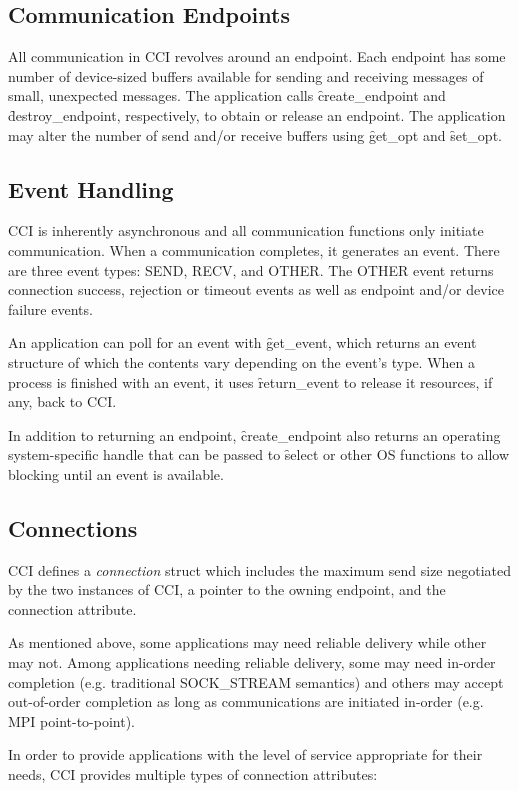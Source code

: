 \documentclass[conference]{IEEEtran}
\begin{document}
\subsection{Communication Endpoints}
All communication in CCI revolves around an endpoint. Each endpoint has some number of
device-sized buffers available for sending and receiving messages of small, unexpected
messages. The application calls \f{create\_endpoint} and \f{destroy\_endpoint},
respectively, to obtain or release an endpoint. The application may alter the number of
send and/or receive buffers using \f{get\_opt} and \f{set\_opt}.

\subsection{Event Handling}
CCI is inherently asynchronous and all communication functions only initiate
communication. When a communication completes, it generates an event. There are three
event types: SEND, RECV, and OTHER. The OTHER event returns connection success, rejection
or timeout events as well as endpoint and/or device failure events.

An application can poll for an event with \f{get\_event}, which returns an event structure
of which the contents vary depending on the event's type. When a process is finished with
an event, it uses \f{return\_event} to release it resources, if any, back to CCI.

In addition to returning an endpoint, \f{create\_endpoint} also returns an operating
system-specific handle that can be passed to \f{select} or other OS functions to allow
blocking until an event is available.

\subsection{Connections}
CCI defines a \emph{connection} struct which includes the maximum send size negotiated by
the two instances of CCI, a pointer to the owning endpoint, and the connection attribute.

As mentioned above, some applications may need reliable delivery while other may not.
Among applications needing reliable delivery, some may need in-order completion (e.g.
traditional SOCK\_STREAM semantics) and others may accept out-of-order completion as long
as communications are initiated in-order (e.g. MPI point-to-point).

In order to provide applications with the level of service appropriate for their needs,
CCI provides multiple types of connection attributes:
\end{document}

